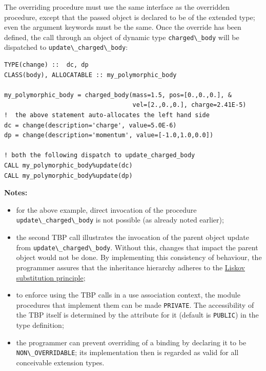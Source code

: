 \documentclass[
  paper=a4,
  ,captions=tableheading
]{scrartcl}
\newcommand{\passthrough}[1]{#1}
\providecommand{\tightlist}{%
  \setlength{\itemsep}{0pt}\setlength{\parskip}{0pt}}
\begin{document}
The overriding procedure must use the same interface as the overridden
procedure, except that the passed object is declared to be of the
extended type; even the argument keywords must be the same. Once the
override has been defined, the call through an object of dynamic type
\passthrough{\lstinline!charged\_body!} will be dispatched to
\passthrough{\lstinline!update\_charged\_body!}:

\begin{lstlisting}
TYPE(change) ::  dc, dp
CLASS(body), ALLOCATABLE :: my_polymorphic_body

my_polymorphic_body = charged_body(mass=1.5, pos=[0.,0.,0.], &
                                   vel=[2.,0.,0.], charge=2.41E-5)
!  the above statement auto-allocates the left hand side
dc = change(description='charge', value=5.0E-6)
dp = change(description='momentum', value=[-1.0,1.0,0.0])

! both the following dispatch to update_charged_body
CALL my_polymorphic_body%update(dc)
CALL my_polymorphic_body%update(dp)
\end{lstlisting}

\textbf{Notes:}

\begin{itemize}
\tightlist
\item
  for the above example, direct invocation of the procedure
  \passthrough{\lstinline!update\_charged\_body!} is not possible (as
  already noted earlier);
\item
  the second TBP call illustrates the invocation of the parent object
  update from \passthrough{\lstinline!update\_charged\_body!}. Without
  this, changes that impact the parent object would not be done. By
  implementing this consistency of behaviour, the programmer assures
  that the inheritance hierarchy adheres to the
  \href{https://en.wikipedia.org/wiki/Liskov_substitution_principle}{Liskov
  substitution principle};
\item
  to enforce using the TBP calls in a use association context, the
  module procedures that implement them can be made
  \passthrough{\lstinline!PRIVATE!}. The accessibility of the TBP itself
  is determined by the attribute for it (default is
  \passthrough{\lstinline!PUBLIC!}) in the type definition;
\item
  the programmer can prevent overriding of a binding by declaring it to
  be \passthrough{\lstinline!NON\_OVERRIDABLE!}; its implementation then
  is regarded as valid for all conceivable extension types.
\end{itemize}
\end{document}

